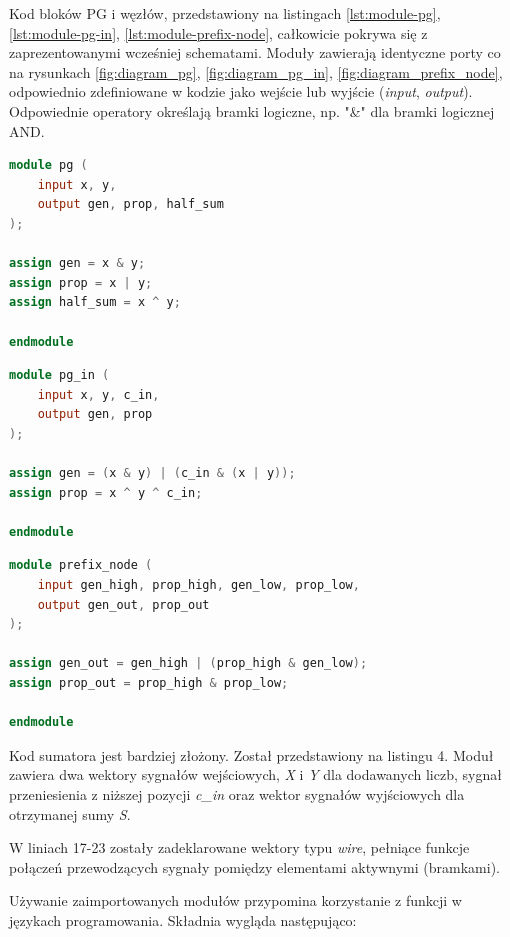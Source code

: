 \documentclass[12pt,oneside,reqno]{article}
\begin{document}
Kod bloków PG i węzłów, przedstawiony na listingach \ref{lst:module-pg}, \ref{lst:module-pg-in}, \ref{lst:module-prefix-node}, całkowicie pokrywa się z zaprezentowanymi wcześniej schematami. Moduły zawierają identyczne porty co na rysunkach \ref{fig:diagram_pg}, \ref{fig:diagram_pg_in}, \ref{fig:diagram_prefix_node}, odpowiednio zdefiniowane w kodzie jako wejście lub wyjście (\textit{input}, \textit{output}). Odpowiednie operatory określają bramki logiczne, np. "\&" dla bramki logicznej AND.

\begin{lstlisting}[caption={Moduł PG}, label={lst:module-pg}, language=Verilog]
module pg (
    input x, y,
    output gen, prop, half_sum
);

assign gen = x & y;
assign prop = x | y;
assign half_sum = x ^ y;

endmodule
\end{lstlisting}

\begin{lstlisting}[caption={Moduł PG\_IN}, label={lst:module-pg-in}, language=Verilog]
module pg_in (
    input x, y, c_in, 
    output gen, prop
);

assign gen = (x & y) | (c_in & (x | y));
assign prop = x ^ y ^ c_in;

endmodule
\end{lstlisting}

\begin{lstlisting}[caption={Moduł węzła}, label={lst:module-prefix-node}, language=Verilog]
module prefix_node (
    input gen_high, prop_high, gen_low, prop_low,
    output gen_out, prop_out
);

assign gen_out = gen_high | (prop_high & gen_low);
assign prop_out = prop_high & prop_low;

endmodule
\end{lstlisting}

\clearpage
Kod sumatora jest bardziej złożony. Został przedstawiony na listingu 4. Moduł zawiera dwa wektory sygnałów wejściowych, \textit{X} i \textit{Y} dla dodawanych liczb, sygnał przeniesienia z niższej pozycji \textit{c\_in} oraz wektor sygnałów wyjściowych dla otrzymanej sumy \textit{S}.

W liniach 17-23 zostały zadeklarowane wektory typu \textit{wire}, pełniące funkcje połączeń przewodzących sygnały pomiędzy elementami aktywnymi (bramkami).

Używanie zaimportowanych modułów przypomina korzystanie z funkcji w językach programowania. Składnia wygląda następująco:
\end{document}
